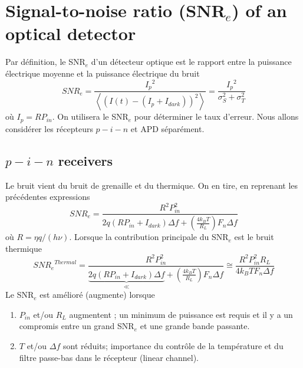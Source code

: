 \section{Signal-to-noise ratio (SNR$_e$) of an optical detector}
Par définition, le SNR$_e$ d'un détecteur optique est le rapport entre la puissance électrique 
moyenne et la puissance électrique du bruit
\begin{equation}
SN{R_e} = \frac{{{I_p}^2}}{{\left\langle {{{\left( {I\left( t \right) - \left( {{I_p} + {I_{dark}}} \right)} \right)}^2}} \right\rangle }} = \frac{{{I_p}^2}}{{\sigma _S^2 + \sigma _T^2}}
\end{equation}
où $I_p = RP_{in}$. On utilisera le SNR$_e$ pour déterminer le taux d'erreur. Nous allons considérer
les récepteurs $p-i-n$ et APD séparément.

\subsection{$p-i-n$ receivers}
Le bruit vient du bruit de grenaille et du thermique. On en tire, en reprenant les précédentes
expressions
\begin{equation}
SN{R_e} = \frac{{{R^2}P_{in}^2}}{{2q\left( {R{P_{in}} + {I_{dark}}} \right)\Delta f + \left( {\frac{{4{k_B}T}}{{{R_L}}}} \right){F_n}\Delta f}}
\end{equation}
où $R= \eta q/(h\nu)$. Lorsque la contribution principale du SNR$_e$ est le bruit thermique
\begin{equation}
SN{R_e}^{Thermal} = \frac{{{R^2}P_{in}^2}}{{\underbrace{2q(RP_{in}+I_{dark})\Delta f}_{\ll}+ \left( {\frac{{4{k_B}T}}{{{R_L}}}} \right){F_n}\Delta f}} \cong \frac{{{R^2}P_{in}^2{R_L}}}{{4{k_B}T{F_n}\Delta f}}
\end{equation}
Le SNR$_e$ est amélioré (augmente) lorsque
\begin{enumerate}
\item $P_{in}$ et/ou $R_L$ augmentent ; un minimum de puissance est requis et il y a un compromis 
entre un grand SNR$_e$ et une grande bande passante.
\item $T$ et/ou $\Delta f$ sont réduits; importance du contrôle de la température et du filtre
passe-bas dans le récepteur (linear channel).
\end{enumerate}


